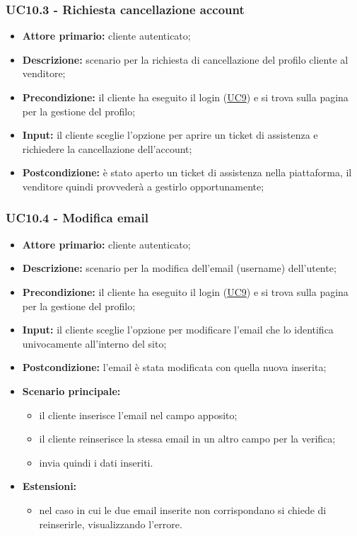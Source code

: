 \subsubsection{UC10.3 - Richiesta cancellazione account}
\label{UC10.3}
\begin{itemize}
    \item \textbf{Attore primario:} cliente autenticato;
    \item \textbf{Descrizione:} scenario per la richiesta di cancellazione del profilo cliente al venditore;
    \item \textbf{Precondizione:} il cliente ha eseguito il login (\hyperref[UC9]{UC9}) e si trova sulla pagina per la gestione del profilo;
    \item \textbf{Input:} il cliente sceglie l'opzione per aprire un ticket di assistenza e richiedere la cancellazione dell'account;
    \item \textbf{Postcondizione:} è stato aperto un ticket di assistenza nella piattaforma, il venditore quindi provvederà a gestirlo opportunamente;
\end{itemize}

\subsubsection{UC10.4 - Modifica email}
\label{UC10.4}
\begin{itemize}
    \item \textbf{Attore primario:} cliente autenticato;
    \item \textbf{Descrizione:} scenario per la modifica dell'email (username) dell'utente;
    \item \textbf{Precondizione:} il cliente ha eseguito il login (\hyperref[UC9]{UC9}) e si trova sulla pagina per la gestione del profilo;
    \item \textbf{Input:} il cliente sceglie l'opzione per modificare l'email che lo identifica univocamente all'interno del sito;
    \item \textbf{Postcondizione:} l'email è stata modificata con quella nuova inserita;
    \item \textbf{Scenario principale:}
    \begin{itemize}
        \item il cliente inserisce l'email nel campo apposito;
        \item il cliente reinserisce la stessa email in un altro campo per la verifica;
        \item invia quindi i dati inseriti.
    \end{itemize}
    \item \textbf{Estensioni:}
    \begin{itemize}
        \item nel caso in cui le due email inserite non corrispondano si chiede di reinserirle, visualizzando l'errore.
    \end{itemize}
\end{itemize}

